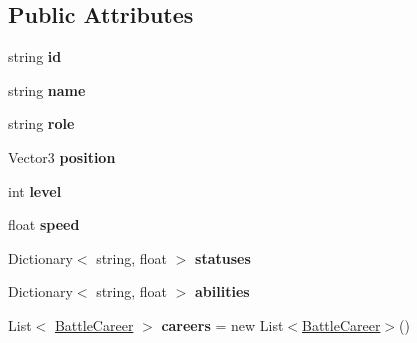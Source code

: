 \subsection*{Public Attributes}
\begin{DoxyCompactItemize}
\item 
string {\bfseries id}\hypertarget{classdoki_battle_1_1_battle_character_aab3389da5001356ebd7edb00d4a51b08}{}\label{classdoki_battle_1_1_battle_character_aab3389da5001356ebd7edb00d4a51b08}

\item 
string {\bfseries name}\hypertarget{classdoki_battle_1_1_battle_character_ab8e13b99df17e5c4b8f023e942a43866}{}\label{classdoki_battle_1_1_battle_character_ab8e13b99df17e5c4b8f023e942a43866}

\item 
string {\bfseries role}\hypertarget{classdoki_battle_1_1_battle_character_a914f662735a4b655f9b63fc4714a00d0}{}\label{classdoki_battle_1_1_battle_character_a914f662735a4b655f9b63fc4714a00d0}

\item 
Vector3 {\bfseries position}\hypertarget{classdoki_battle_1_1_battle_character_acfb8fe643392f464140ecbc7cb4a84b0}{}\label{classdoki_battle_1_1_battle_character_acfb8fe643392f464140ecbc7cb4a84b0}

\item 
int {\bfseries level}\hypertarget{classdoki_battle_1_1_battle_character_a69011cacd9696e54ab9c6a07127ddff5}{}\label{classdoki_battle_1_1_battle_character_a69011cacd9696e54ab9c6a07127ddff5}

\item 
float {\bfseries speed}\hypertarget{classdoki_battle_1_1_battle_character_a27735a589f3b2216e5c71e876775fece}{}\label{classdoki_battle_1_1_battle_character_a27735a589f3b2216e5c71e876775fece}

\item 
Dictionary$<$ string, float $>$ {\bfseries statuses}\hypertarget{classdoki_battle_1_1_battle_character_af5f3ca3eb7c5c613b7c627abba88ecf5}{}\label{classdoki_battle_1_1_battle_character_af5f3ca3eb7c5c613b7c627abba88ecf5}

\item 
Dictionary$<$ string, float $>$ {\bfseries abilities}\hypertarget{classdoki_battle_1_1_battle_character_ad3217455f79934ce63c7093716fbc26a}{}\label{classdoki_battle_1_1_battle_character_ad3217455f79934ce63c7093716fbc26a}

\item 
List$<$ \hyperlink{classdoki_battle_1_1_battle_career}{Battle\+Career} $>$ {\bfseries careers} = new List$<$\hyperlink{classdoki_battle_1_1_battle_career}{Battle\+Career}$>$()\hypertarget{classdoki_battle_1_1_battle_character_a82e76fcfa6612deae1d185acccff386f}{}\label{classdoki_battle_1_1_battle_character_a82e76fcfa6612deae1d185acccff386f}


\end{DoxyCompactItemize}
